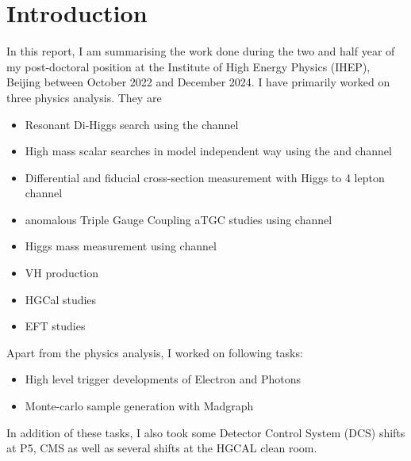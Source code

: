 \chapter{Introduction}
In this report, I am summarising the work done during the two and half year of my post-doctoral
position at the Institute of High Energy Physics (IHEP), Beijing between October 2022
and December 2024. I have primarily worked on three physics analysis.
They are
\begin{itemize}
    \item Resonant Di-Higgs search using the \HHWW channel
    \item High mass scalar searches in model independent way using the \XZZ and \XZZv channel
    \item Differential and fiducial cross-section measurement with Higgs to 4 lepton channel
    \item anomalous Triple Gauge Coupling aTGC studies using \WpWm channel
    \item Higgs mass measurement using \HGG channel
    \item VH production
    \item HGCal studies
    \item EFT studies
\end{itemize}
Apart from the physics analysis, I worked on following tasks:
\begin{itemize}
    \item High level trigger developments of Electron and Photons
    \item Monte-carlo sample generation with Madgraph
\end{itemize}
In addition of these tasks, I also took some Detector Control System (DCS) shifts at P5, CMS as well
as several shifts at the HGCAL clean room.
